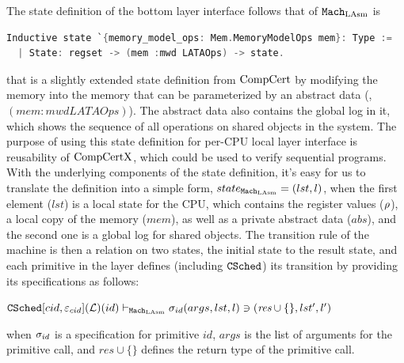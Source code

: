 The state definition of the bottom layer interface follows that of ${\mathrm{\texttt{Mach}}}_{\mathrm{LAsm}}$ is
\begin{lstlisting}[language=C]
Inductive state `{memory_model_ops: Mem.MemoryModelOps mem}: Type :=
  | State: regset -> (mem :mwd LATAOps) -> state.
\end{lstlisting}
that is a slightly extended state definition from $\mathrm{CompCert}$ by modifying the memory 
into the memory that can be parameterized by an abstract data (\ie, $(mem :mwd LATAOps)$).
The abstract data also contains the global log in it, which shows the sequence of all operations on shared objects in the system. 
The purpose of using this state definition for per-CPU local layer interface is reusability of $\mathrm{CompCertX}$, which could be used to verify sequential programs. 
With the underlying components of the state definition, 
it's easy for us to translate the definition into a simple form, $state_{{\mathrm{\texttt{Mach}}}_{\mathrm{LAsm}}} = (lst, l)$,
when the first element ($lst$) is a local state for the CPU, which contains 
the register values ($\rho$), a local copy of the memory ($mem$), as well as a private abstract data ($abs$),
and the second one is a global log for shared objects.
%
The transition rule of the machine is then a relation on two states, the initial state to the result state, 
and each primitive in the layer defines (including ${{\mathrm{\texttt{CSched}}}}$) its transition by providing its specifications as follows:
\begin{center}
${{\mathrm{\texttt{CSched}}}}[cid, {\varepsilon}_{cid}](\mathcal{L})(id)
 \vdash_{{\mathrm{\texttt{Mach}}}_{\mathrm{LAsm}}}  \sigma_{id}(args, lst, l) \ni (\textit{res}\cup \{\}, lst', l')$
\end{center}
{\noindent}when $\sigma_{id}$ is a specification for primitive $id$,
$args$ is the list of arguments for the primitive call, and $\textit{res}\cup \{\}$ defines the 
return type of the primitive call.


